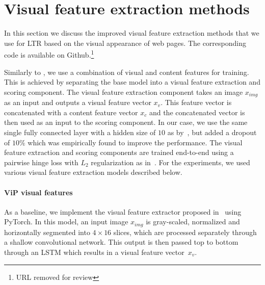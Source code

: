 
\section{Visual feature extraction methods}
In this section we discuss the improved visual feature extraction methods that we use for \ac{LTR} based on the visual appearance of web pages. The corresponding code is available on Github.\footnote{URL removed for review}

Similarly to \cite{fan2017learning}, we use a combination of visual and content features for training.
This is achieved by separating the base model into a visual feature extraction and scoring component.
The visual feature extraction component takes an image $x_{img}$ as an input and outputs a visual feature vector $x_{v}$.
This feature vector is concatenated with a content feature vector $x_{c}$ and the concatenated vector is then used as an input to the scoring component.
In our case, we use the same single fully connected layer with a hidden size of $10$ as by~\citep{fan2017learning}, but added a dropout of $10\%$ which was empirically found to improve the performance. 
The visual feature extraction and scoring components are trained end-to-end using a pairwise hinge loss with $L_2$ regularization as in~\cite{fan2017learning}.
For the experiments, we used various visual feature extraction models described below.

\paragraph{ViP visual features}
As a baseline, we implement the visual feature extractor proposed in~\citet{fan2017learning} using PyTorch.
In this model, an input image $x_{img}$ is gray-scaled, normalized and horizontally segmented into $4\times16$ slices, which are processed separately through a shallow convolutional network.
This output is then passed top to bottom through an LSTM which results in a visual feature vector~$x_{v}$. 

